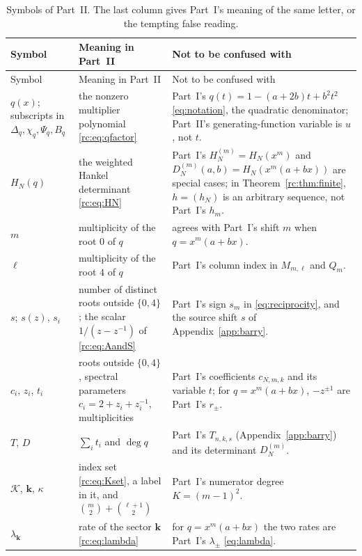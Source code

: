 \documentclass[11pt,a4paper]{article}
\numberwithin{equation}{section}
\theoremstyle{definition}
\theoremstyle{remark}
\newcommand{\bk}{\boldsymbol{k}}
\begin{document}
\begingroup\small
\renewcommand{\arraystretch}{1.15}
\begin{longtable}{@{}>{\raggedright}p{}>{\raggedright}p{}>{\raggedright\arraybackslash}p{}@{}}
\caption{Symbols of Part~II.  The last column gives Part~I's meaning of
the same letter, or the tempting false reading.}\label{rc:tab:notation}\\
\toprule
Symbol & Meaning in Part~II & Not to be confused with\\
\midrule
\endfirsthead
\toprule
Symbol & Meaning in Part~II & Not to be confused with\\
\midrule
\endhead
\bottomrule
\endfoot
$q(x)$; subscripts in $\Delta_q,\chi_q,\Psi_q,B_q$
 & the nonzero multiplier polynomial \eqref{rc:eq:qfactor}
 & Part~I's $q(t)=1-(a+2b)t+b^2t^2$ \eqref{eq:notation}, the quadratic
   denominator; Part~II's generating-function variable is $u$, not $t$.\\
$H_N(q)$
 & the weighted Hankel determinant \eqref{rc:eq:HN}
 & Part~I's $H_N^{(m)}=H_N(x^m)$ and $D_N^{(m)}(a,b)=H_N(x^m(a+bx))$ are
   special cases; in Theorem~\ref{rc:thm:finite}, $h=(h_N)$ is an
   arbitrary sequence, not Part~I's $h_m$.\\
$m$ & multiplicity of the root $0$ of $q$
 & agrees with Part~I's shift $m$ when $q=x^m(a+bx)$.\\
$\ell$ & multiplicity of the root $4$ of $q$
 & Part~I's column index in $M_{m,\ell}$ and $Q_m$.\\
$s$; $s(z)$, $s_i$
 & number of distinct roots outside $\{0,4\}$; the scalar
   $1/(z-z^{-1})$ of \eqref{rc:eq:AandS}
 & Part~I's sign $s_m$ in \eqref{eq:reciprocity}, and the source shift
   $s$ of Appendix~\ref{app:barry}.\\
$c_i$, $z_i$, $t_i$
 & roots outside $\{0,4\}$, spectral parameters $c_i=2+z_i+z_i^{-1}$,
   multiplicities
 & Part~I's coefficients $c_{N,m,k}$ and its variable $t$; for
   $q=x^m(a+bx)$, $-z^{\pm1}$ are Part~I's $r_\pm$.\\
$T$, $D$ & $\sum_it_i$ and $\deg q$
 & Part~I's $T_{n,k,s}$ (Appendix~\ref{app:barry}) and its determinant
   $D_N^{(m)}$.\\
$\mathcal K$, $\bk$, $\kappa$
 & index set \eqref{rc:eq:Kset}, a label in it, and
   $\binom m2+\binom{\ell+1}2$
 & Part~I's numerator degree $K=(m-1)^2$.\\
$\lambda_{\bk}$ & rate of the sector $\bk$ \eqref{rc:eq:lambda}
 & for $q=x^m(a+bx)$ the two rates are Part~I's $\lambda_\pm$
   \eqref{eq:lambda}.\\

\end{longtable}
\end{document}
